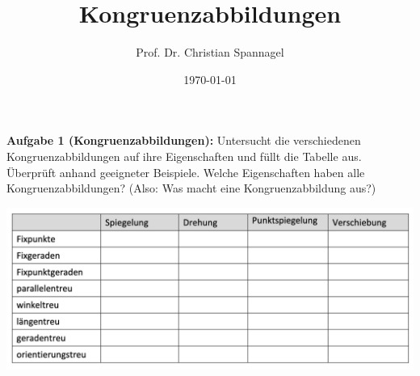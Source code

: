 \documentclass{../cssheet}
\title{Kongruenzabbildungen}
\author{Prof. Dr. Christian Spannagel}
\date{\today}
\begin{document}
\printtitle

\textbf{Aufgabe 1 (Kongruenzabbildungen):}  Untersucht die verschiedenen Kongruenzabbildungen auf ihre Eigenschaften und füllt die Tabelle aus. Überprüft anhand geeigneter Beispiele. Welche Eigenschaften haben alle Kongruenzabbildungen? (Also: Was macht eine Kongruenzabbildung aus?)

\includegraphics[width=16cm]{tabelle.png}
\vspace*{10mm}

\printlicense

\printsocials
\end{document}
